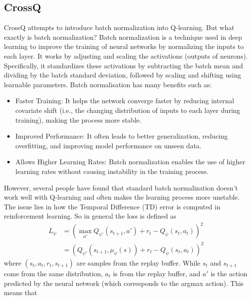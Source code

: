 \subsection{CrossQ}
CrossQ \cite{bhatt2024crossqbatchnormalizationdeep} attempts to introduce batch 
normalization into Q-learning. But what exactly is batch normalization?\newline
Batch normalization is a technique used in deep learning to improve the training of neural 
networks by normalizing the inputs to each layer. It works by adjusting and scaling the 
activations (outputs of neurons). Specifically, it standardizes these activations by 
subtracting the batch mean and dividing by the batch standard deviation, followed by 
scaling and shifting using learnable parameters. Batch normalisation has many benefits such 
as:
\begin{itemize}
    \item Faster Training: It helps the network converge faster by reducing internal 
    covariate shift (i.e., the changing distribution of inputs to each layer during 
    training), making the process more stable.
    
    \item Improved Performance: It often leads to better generalization, reducing 
    overfitting, and improving model performance on unseen data.
    
    \item Allows Higher Learning Rates: Batch normalization enables the use of higher 
    learning rates without causing instability in the training process.
\end{itemize}
However, several people have found that standard batch normalization doesn't work well with 
Q-learning and often makes the learning process more unstable. The issue lies in how the 
Temporal Difference (TD) error is computed in reinforcement learning. So in general the 
loss is defined as 
\begin{align*}
    L_\psi &= \left(\max_{a'}Q_{\psi'}(s_{t+1},a') + r_t - Q_\psi(s_t,a_t)\right)^2 \\
     &= \left(Q_{\psi'}(s_{t+1},\mu_\psi(s)) + r_t - Q_\psi(s_t,a_t)\right)^2 
\end{align*}
where $(s_t,a_t,r_t,s_{t+1})$ are samples from the replay buffer. While $s_t$ and $s_{t+1}$
come from the same distribution, $a_t$ is from the replay buffer, and $a'$ is the action 
predicted by the neural network (which corresponds to the argmax action). This means that
